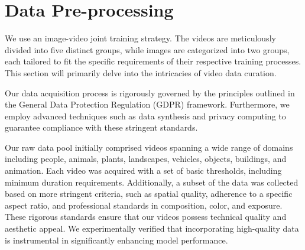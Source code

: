 \section{Data Pre-processing}
\label{sec:data}


We use an image-video joint training strategy.
The videos are meticulously divided into five distinct groups, while images are categorized into two groups, each tailored to fit the specific requirements of their respective training processes. This section will primarily delve into the intricacies of video data curation.

Our data acquisition process is rigorously governed by the principles outlined in the General Data Protection Regulation (GDPR) \cite{investopedia_gdpr} framework. Furthermore, we employ advanced techniques such as data synthesis and privacy computing to guarantee compliance with these stringent standards.

Our raw data pool initially comprised videos spanning a wide range of domains including people, animals, plants, landscapes, vehicles, objects, buildings, and animation. Each video was acquired with a set of basic thresholds, including minimum duration requirements. Additionally, a subset of the data was collected based on more stringent criteria, such as spatial quality, adherence to a specific aspect ratio, and professional standards in composition, color, and exposure. These rigorous standards ensure that our videos possess technical quality and aesthetic appeal. We experimentally verified that incorporating high-quality data is instrumental in significantly enhancing model performance.



